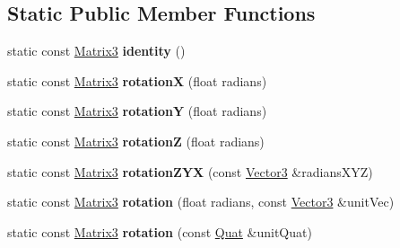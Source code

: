 \subsection*{Static Public Member Functions}
\begin{DoxyCompactItemize}
\item 
\hypertarget{class_vectormath_1_1_aos_1_1_matrix3_a2a547d4b9b834f6a7fbe9e8ed91e5104}{static const \hyperlink{class_vectormath_1_1_aos_1_1_matrix3}{Matrix3} {\bfseries identity} ()}\label{class_vectormath_1_1_aos_1_1_matrix3_a2a547d4b9b834f6a7fbe9e8ed91e5104}

\item 
\hypertarget{class_vectormath_1_1_aos_1_1_matrix3_a77a1df8b08c098f7791c42d5f38b7824}{static const \hyperlink{class_vectormath_1_1_aos_1_1_matrix3}{Matrix3} {\bfseries rotation\+X} (float radians)}\label{class_vectormath_1_1_aos_1_1_matrix3_a77a1df8b08c098f7791c42d5f38b7824}

\item 
\hypertarget{class_vectormath_1_1_aos_1_1_matrix3_aa5c4755f2831ef1e91990b67f7e5d1c4}{static const \hyperlink{class_vectormath_1_1_aos_1_1_matrix3}{Matrix3} {\bfseries rotation\+Y} (float radians)}\label{class_vectormath_1_1_aos_1_1_matrix3_aa5c4755f2831ef1e91990b67f7e5d1c4}

\item 
\hypertarget{class_vectormath_1_1_aos_1_1_matrix3_aa512238d83080ba01a5e495fb70ddccb}{static const \hyperlink{class_vectormath_1_1_aos_1_1_matrix3}{Matrix3} {\bfseries rotation\+Z} (float radians)}\label{class_vectormath_1_1_aos_1_1_matrix3_aa512238d83080ba01a5e495fb70ddccb}

\item 
\hypertarget{class_vectormath_1_1_aos_1_1_matrix3_a06f5e5c5c28985521d6ac23a5cbcce85}{static const \hyperlink{class_vectormath_1_1_aos_1_1_matrix3}{Matrix3} {\bfseries rotation\+Z\+Y\+X} (const \hyperlink{class_vectormath_1_1_aos_1_1_vector3}{Vector3} \&radians\+X\+Y\+Z)}\label{class_vectormath_1_1_aos_1_1_matrix3_a06f5e5c5c28985521d6ac23a5cbcce85}

\item 
\hypertarget{class_vectormath_1_1_aos_1_1_matrix3_aa94ef7bd316734d28409207b2acc28d3}{static const \hyperlink{class_vectormath_1_1_aos_1_1_matrix3}{Matrix3} {\bfseries rotation} (float radians, const \hyperlink{class_vectormath_1_1_aos_1_1_vector3}{Vector3} \&unit\+Vec)}\label{class_vectormath_1_1_aos_1_1_matrix3_aa94ef7bd316734d28409207b2acc28d3}

\item 
\hypertarget{class_vectormath_1_1_aos_1_1_matrix3_a3327257a702b9cb2d7812ddce7031368}{static const \hyperlink{class_vectormath_1_1_aos_1_1_matrix3}{Matrix3} {\bfseries rotation} (const \hyperlink{class_vectormath_1_1_aos_1_1_quat}{Quat} \&unit\+Quat)}\label{class_vectormath_1_1_aos_1_1_matrix3_a3327257a702b9cb2d7812ddce7031368}


\end{DoxyCompactItemize}
